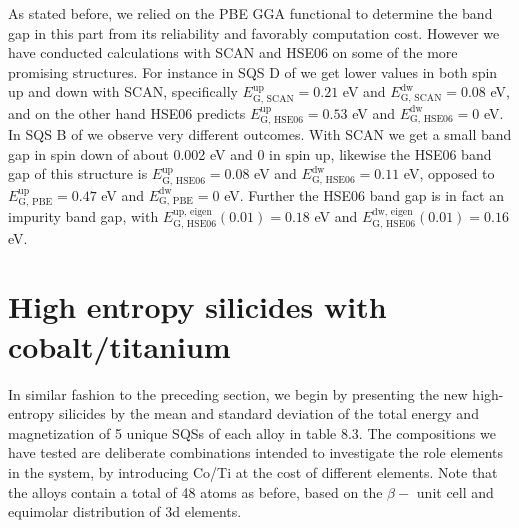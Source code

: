 As stated before, we relied on the PBE GGA functional to determine the band gap in this part from its reliability and favorably computation cost. However we have conducted calculations with SCAN and HSE06 on some of the more promising structures. For instance in SQS D of  we get lower values in both spin up and down with SCAN, specifically $E_\text{G, SCAN} ^\text{up}= 0.21$ eV and $E_\text{G, SCAN} ^\text{dw} = 0.08$ eV, and on the other hand HSE06 predicts $E_\text{G, HSE06} ^\text{up} = 0.53$ eV and $E_\text{G, HSE06} ^\text{dw} = 0$ eV. In SQS B of  we observe very different outcomes. With SCAN we get a small band gap in spin down of about 0.002 eV and 0 in spin up, likewise the HSE06 band gap of this structure is $E_\text{G, HSE06} ^\text{up} = 0.08$ eV and $E_\text{G, HSE06} ^\text{dw} = 0.11$ eV, opposed to $E_\text{G, PBE} ^\text{up} = 0.47$ eV and $E_\text{G, PBE} ^\text{dw} = 0$ eV. Further the HSE06 band gap is in fact an impurity band gap, with $E_\text{G, HSE06} ^\text{up, eigen}(0.01) = 0.18$ eV and $E_\text{G, HSE06} ^\text{dw, eigen}(0.01) = 0.16$ eV.


\section{High entropy silicides with cobalt/titanium}

In similar fashion to the preceding section, we begin by presenting the new high-entropy silicides by the mean and standard deviation of the total energy and magnetization of 5 unique SQSs of each alloy in table 8.3. The compositions we have tested are deliberate combinations intended to investigate the role elements in the  system, by introducing Co/Ti at the cost of different elements. Note that the alloys contain a total of 48 atoms as before, based on the $\beta-$  unit cell and equimolar distribution of 3d elements.   

